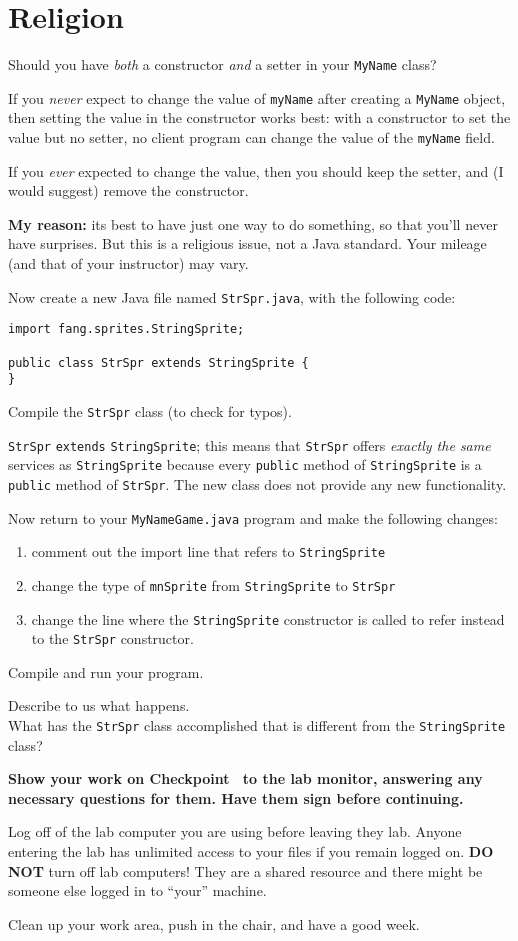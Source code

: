 \documentclass[12pt,twoside]{memoir}
\newcommand\code[1]{\lstinline^#1^}
\newenvironment{Checkpoint}[1]{%
\begin{Exercise}[name={Checkpoint},title={#1}]}{%
\end{Exercise}%
\textbf{Show your work on Checkpoint~\theExercise{} to the lab monitor, %
  answering any necessary questions for them.  Have them sign before continuing.}}
\begin{document}
\section*{Religion}
Should you have \emph{both} a constructor \emph{and} a setter in your
\code{MyName} class?

If you \emph{never} expect to change the value of \code{myName} after
creating a \code{MyName} object, then setting the value in the
constructor works best: with a constructor to set the value but no
setter, no client program can change the value of the \code{myName}
field.

If you {\em ever} expected to change the value, then you should keep
the setter, and (I would suggest) remove the constructor.

\textbf{My reason:} its best to have just one way to do something, so
that you'll never have surprises.  But this is a religious issue, not
a Java standard. Your mileage (and that of your instructor) may vary.
\newpage

\begin{Checkpoint}{Silly extension}
Now create a new Java file named \code{StrSpr.java}, with the
following code:

\begin{lstlisting}
import fang.sprites.StringSprite;

public class StrSpr extends StringSprite {
}
\end{lstlisting}

Compile the \code{StrSpr} class (to check for typos). 

\code{StrSpr} \code{extends} \code{StringSprite}; this means that
\code{StrSpr} offers \emph{exactly the same} services as
\code{StringSprite} because every \code{public} method of
\code{StringSprite} is a \code{public} method of \code{StrSpr}. The
new class does not provide any new functionality.

Now return to your \code{MyNameGame.java} program and make the
following changes:

\begin{enumerate}
\item comment out the import line that refers to \code{StringSprite}
\item change the type of \code{mnSprite} from \code{StringSprite} to
  \code{StrSpr}
\item change the line where the \code{StringSprite} constructor is
  called to refer instead to the \code{StrSpr} constructor.
\end{enumerate}

Compile and run your program.

Describe to us what happens.\\
What has the \code{StrSpr} class accomplished that is different from
the \code{StringSprite} class?
\end{Checkpoint}

\Large{Log off of the lab computer you are using before leaving they
  lab. Anyone entering the lab has unlimited access to your files if
  you remain logged on. \textbf{DO NOT} turn off lab computers! They
  are a shared resource and there might be someone else logged in to
  ``your'' machine.}

\Large{Clean up your work area, push in the chair, and have a good
  week.}
\end{document}
